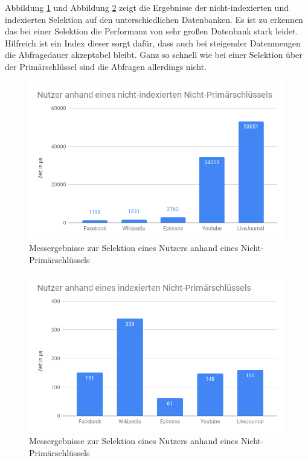 Abbildung \ref{fig:NutzerNPk} und Abbildung \ref{fig:NutzerNPkI} zeigt die Ergebnisse der nicht-indexierten und indexierten Selektion auf den unterschiedlichen Datenbanken. Es ist zu erkennen das bei einer Selektion die Performanz von sehr großen Datenbank stark leidet. Hilfreich ist ein Index dieser sorgt dafür, dass auch bei steigender Datenmengen die Abfragedauer akzeptabel bleibt. Ganz so schnell wie bei einer Selektion über der Primärschlüssel sind die Abfragen allerdings nicht.
\begin{figure}[h]
	\centering
	\includegraphics[width=\textwidth]{images/NutzerNPk.png}
	\caption{Messergebnisse zur Selektion eines Nutzers anhand eines Nicht-Primärschlüssels}
	\label{fig:NutzerNPk}
\end{figure}

\begin{figure}[h]
	\centering
	\includegraphics[width=\textwidth]{images/NutzerNPkI.png}
	\caption{Messergebnisse zur Selektion eines Nutzers anhand eines Nicht-Primärschlüssels}
	\label{fig:NutzerNPkI}
\end{figure}


